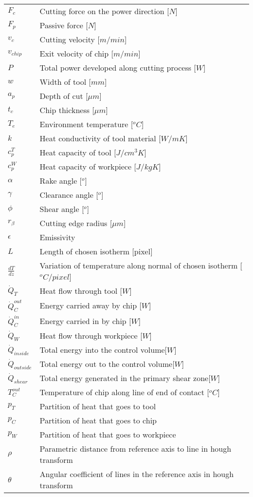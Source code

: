 \begin{longtable}{ll}
$F_{c}$ & Cutting force on the power direction [$N$]\\
$F_{p}$ & Passive force [$N$]\\
$v_{c}$ & Cutting velocity [$m/min$]\\
$v_{chip}$ & Exit velocity of chip [$m/min$]\\
$P$ & Total power developed along cutting process [$W$]\\
$w$ & Width of tool [$mm$]\\
$a_{p}$ & Depth of cut [$\mu$$m$]\\
$t_{c}$ & Chip thickness [$\mu$$m$]\\
$T_{e}$ & Environment temperature [$^{o}C$]\\
$k$ & Heat conductivity of tool material [$W/mK$]\\
$c_{p}^{T}$ & Heat capacity of tool [$J/cm^{3}K$]\\
$c_{p}^{W}$ & Heat capacity of workpiece [$J/kgK$]\\
$\alpha$ & Rake angle [$^{o}$]\\
$\gamma$ & Clearance angle [$^{o}$]\\
$\phi$ & Shear angle [$^{o}$]\\
$r_{\beta}$ & Cutting edge radius [$\mu$$m$]\\
$\epsilon$ & Emissivity\\
$L$ & Length of chosen isotherm [pixel]\\
$\frac{dT}{dz}$ & Variation of temperature along normal of chosen isotherm [$^{o}C/pixel$]\\
$\dot{Q}_{T}$ & Heat flow through tool [$W$]\\
$\dot{Q}_{C}^{out}$ & Energy carried away by chip [$W$]\\
$\dot{Q}_{C}^{in}$ & Energy carried in by chip [$W$]\\
$\dot{Q}_{W}$ & Heat flow through workpiece [$W$]\\
$\dot{Q}_{inside}$ & Total energy into the control volume[$W$]\\
$\dot{Q}_{outside}$ & Total energy out to the control volume[$W$]\\
$\dot{Q}_{shear}$ & Total energy generated in the primary shear zone[$W$]\\
${T}_{C}^{out}$ & Temperature of chip along line of end of contact [$^{o}C$]\\
$p_{T}$ & Partition of heat that goes to tool\\
$p_{C}$ & Partition of heat that goes to chip\\
$p_{W}$ & Partition of heat that goes to workpiece\\
$\rho$ & Parametric distance from reference axis to line in hough transform\\
$\theta$ & Angular coefficient of lines in the reference axis in hough transform\\
\end{longtable}

